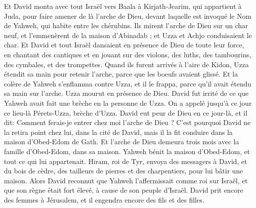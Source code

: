 \begin{multicols}{2}
Et David monta avec tout Israël vers Baala à Kirjath-Jearim, qui appartient à Juda, pour faire amener de là l'arche de Dieu, devant laquelle est invoqué le Nom de Yahweh, qui habite entre les chérubins.
Ils mirent l'arche de Dieu sur un char neuf, et l'emmenèrent de la maison d'Abinadab ; et Uzza et Achjo conduisaient le char.
Et David et tout Israël dansaient en présence de Dieu de toute leur force, en chantant des cantiques et en jouant sur des violons, des luths, des tambourins, des cymbales, et des trompettes.
Quand ils furent arrivés à l'aire de Kidon, Uzza étendit sa main pour retenir l'arche, parce que les boeufs avaient glissé.
Et la colère de Yahweh s'enflamma contre Uzza, et il le frappa, parce qu'il avait étendu sa main sur l'arche. Uzza mourut en présence de Dieu.
David fut irrité de ce que Yahweh avait fait une brèche en la personne de Uzza. On a appelé jusqu'à ce jour ce lieu-là Pérets-Uzza, brèche d'Uzza.
David eut peur de Dieu en ce jour-là, et il dit: Comment ferais-je entrer chez moi l'arche de Dieu ?
C'est pourquoi David ne la retira point chez lui, dans la cité de David, mais il la fit conduire dans la maison d'Obed-Edom de Gath.
Et l'arche de Dieu demeura trois mois avec la famille d'Obed-Edom, dans sa maison. Yahweh bénit la maison d'Obed-Edom, et tout ce qui lui appartenait.
\VerseOne{}Hiram, roi de Tyr, envoya des messagers à David, et du bois de cèdre, des tailleurs de pierres et des charpentiers, pour lui bâtir une maison.
Alors David reconnut que Yahweh l'affermissait comme roi sur Israël, et que son règne était fort élevé, à cause de son peuple d'Israël.
David prit encore des femmes à Jérusalem, et il engendra encore des fils et des filles.

\end{multicols}
